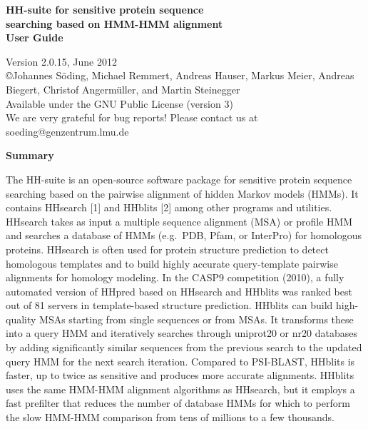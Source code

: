 \documentclass[11pt,a4paper]{article}
\begin{document}


\begin{center}

\vspace{20mm}
 
{\huge \bf HH-suite for sensitive protein sequence\\[2mm] searching based on HMM-HMM alignment}\\[4mm] 

{\Large \bf User Guide}

  Version 2.0.15, June 2012\\[2mm]
{\copyright  Johannes S\"oding, Michael Remmert, Andreas Hauser, Markus Meier, Andreas Biegert, Christof Angerm\"uller, and Martin Steinegger}\\[2mm]

Available under the GNU Public License (version 3)\\[2mm]
We are very grateful for bug reports! Please contact us at soeding@genzentrum.lmu.de

{\bf \Large Summary}

\end{center}

\noindent The HH-suite is an open-source software package for sensitive protein sequence searching based on the pairwise alignment of hidden Markov models (HMMs). It contains HHsearch [1] and HHblits [2] among other programs and utilities. HHsearch takes as input a multiple sequence alignment (MSA) or profile HMM and searches a database of HMMs (e.g.\ PDB, Pfam, or InterPro) for homologous proteins. HHsearch is often used for protein structure prediction to detect homologous templates and to build highly accurate query-template pairwise alignments for homology modeling. In the CASP9 competition (2010), a fully automated version of HHpred based on HHsearch and HHblits was ranked best out of 81 servers in template-based structure prediction. HHblits can build high-quality MSAs starting from single sequences or from MSAs. It transforms these into a query HMM and iteratively searches through uniprot20 or nr20 databases by adding significantly similar sequences from the previous search to the updated query HMM for the next search iteration. Compared to PSI-BLAST, HHblits is faster, up to twice as sensitive and produces more accurate alignments. HHblits uses the same HMM-HMM alignment algorithms as HHsearch, but it employs a fast prefilter that reduces the number of database HMMs for which to perform the slow HMM-HMM comparison from tens of millions to a few thousands. 
\\[2mm]
\end{document}
